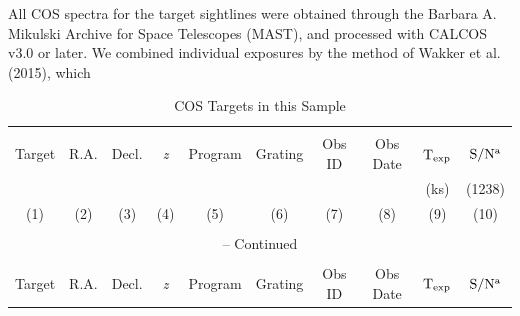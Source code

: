 All COS spectra for the target sightlines were obtained through the Barbara A. Mikulski Archive for Space Telescopes (MAST), and processed with CALCOS v3.0 or later. We combined individual exposures by the method of Wakker et al. (2015), which
\begin{landscape}

\renewcommand{\thefootnote}{\alph{footnote}}

\scriptsize
\begin{center}
\begin{longtable}{l l l l l l l l l l}
\caption[Pilot Sample: COS Targets]{COS Targets in this Sample} \label{table1} \\

\hline \hline \\[-2ex]
  \multicolumn{1}{c}{Target} & 
  \multicolumn{1}{c}{R.A.} &
  \multicolumn{1}{c}{Decl.} &
  \multicolumn{1}{c}{\textit{z}} &
  \multicolumn{1}{c}{Program} &
  \multicolumn{1}{c}{Grating} &
  \multicolumn{1}{c}{Obs ID} &
  \multicolumn{1}{c}{Obs Date} &
  \multicolumn{1}{c}{$\rm T_{exp}$\tablenotemark{a}} &
  \multicolumn{1}{c}{$\rm S/N^a$}  \\
  
  \multicolumn{1}{c}{} & 
  \multicolumn{1}{c}{} &
  \multicolumn{1}{c}{} &
  \multicolumn{1}{c}{} &
  \multicolumn{1}{c}{} &
  \multicolumn{1}{c}{} &
  \multicolumn{1}{c}{} &
  \multicolumn{1}{c}{} &
  \multicolumn{1}{c}{(ks)} &
  \multicolumn{1}{c}{(1238)} \\
  
  \multicolumn{1}{c}{(1)} & 
  \multicolumn{1}{c}{(2)} &
  \multicolumn{1}{c}{(3)} &
  \multicolumn{1}{c}{(4)} &
  \multicolumn{1}{c}{(5)} &
  \multicolumn{1}{c}{(6)} &
  \multicolumn{1}{c}{(7)} &
  \multicolumn{1}{c}{(8)} &
  \multicolumn{1}{c}{(9)} &
  \multicolumn{1}{c}{(10)} \\[0.5ex] \hline \\[-1.8ex]
\endfirsthead

\multicolumn{10}{c}{{\tablename} \thetable{} -- Continued} \\[0.5ex]
\hline \hline \\[-2ex]
  \multicolumn{1}{c}{Target} & 
  \multicolumn{1}{c}{R.A.} &
  \multicolumn{1}{c}{Decl.} &
  \multicolumn{1}{c}{\textit{z}} &
  \multicolumn{1}{c}{Program} &
  \multicolumn{1}{c}{Grating} &
  \multicolumn{1}{c}{Obs ID} &
  \multicolumn{1}{c}{Obs Date} &
  \multicolumn{1}{c}{$\rm T_{exp}$\tablenotemark{a}} &
  \multicolumn{1}{c}{$\rm S/N^a$}  \\
  

\end{longtable}
\end{center}
\end{landscape}
